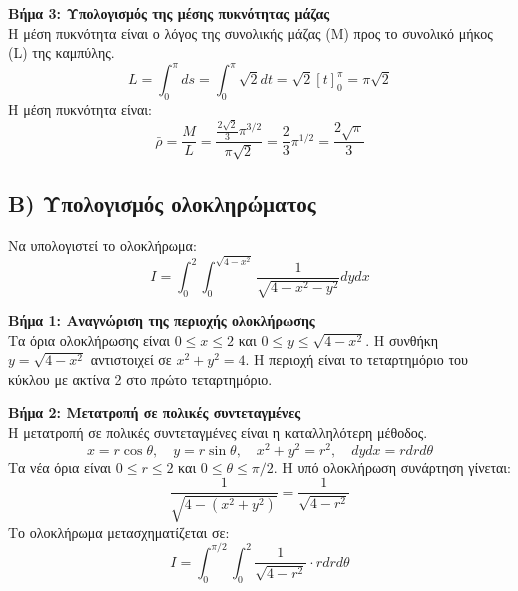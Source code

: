 \documentclass[a4paper,12pt,twoside]{article}
\begin{document}
\noindent
\textbf{Βήμα 3: Υπολογισμός της μέσης πυκνότητας μάζας}\\
\noindent
Η μέση πυκνότητα είναι ο λόγος της συνολικής μάζας (M) προς το συνολικό μήκος (L) της καμπύλης.
\[ L = \int_0^\pi ds = \int_0^\pi \sqrt{2} dt = \sqrt{2} [t]_0^\pi = \pi\sqrt{2} \]
Η μέση πυκνότητα είναι:
\[ \bar{\rho} = \frac{M}{L} = \frac{\frac{2\sqrt{2}}{3}\pi^{3/2}}{\pi\sqrt{2}} = \frac{2}{3}\pi^{1/2} = \frac{2\sqrt{\pi}}{3} \]

\hrulefill
\vspace{1em}

\subsection*{B) Υπολογισμός ολοκληρώματος}
\noindent
Να υπολογιστεί το ολοκλήρωμα:
\[ I = \int_0^2 \int_0^{\sqrt{4-x^2}} \frac{1}{\sqrt{4 - x^2 - y^2}} dy dx \]

\noindent
\textbf{Βήμα 1: Αναγνώριση της περιοχής ολοκλήρωσης}\\
\noindent
Τα όρια ολοκλήρωσης είναι $0 \le x \le 2$ και $0 \le y \le \sqrt{4-x^2}$. Η συνθήκη $y = \sqrt{4-x^2}$ αντιστοιχεί σε $x^2+y^2=4$. Η περιοχή είναι το τεταρτημόριο του κύκλου με ακτίνα 2 στο πρώτο τεταρτημόριο.
\begin{center}
\end{center}
\noindent
\textbf{Βήμα 2: Μετατροπή σε πολικές συντεταγμένες}\\
\noindent
Η μετατροπή σε πολικές συντεταγμένες είναι η καταλληλότερη μέθοδος.
\[ x = r\cos\theta, \quad y = r\sin\theta, \quad x^2+y^2=r^2, \quad dy dx = r dr d\theta \]
Τα νέα όρια είναι $0 \le r \le 2$ και $0 \le \theta \le \pi/2$.
Η υπό ολοκλήρωση συνάρτηση γίνεται:
\[ \frac{1}{\sqrt{4 - (x^2 + y^2)}} = \frac{1}{\sqrt{4 - r^2}} \]
Το ολοκλήρωμα μετασχηματίζεται σε:
\[ I = \int_0^{\pi/2} \int_0^2 \frac{1}{\sqrt{4 - r^2}} \cdot r dr d\theta \]
\end{document}
